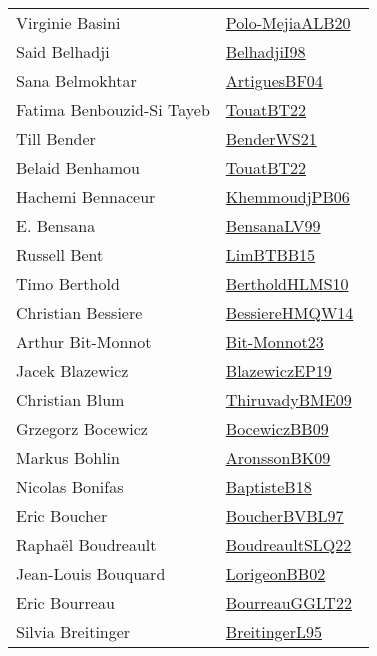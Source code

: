 {\begin{longtable}{p{4cm}p{20cm}}
Virginie Basini & \href{}{Polo-MejiaALB20}~\cite{Polo-MejiaALB20}\\
Said Belhadji & \href{articles/BelhadjiI98.pdf}{BelhadjiI98}~\cite{BelhadjiI98}\\
Sana Belmokhtar & \href{papers/ArtiguesBF04.pdf}{ArtiguesBF04}~\cite{ArtiguesBF04}\\
Fatima Benbouzid{-}Si Tayeb & \href{papers/TouatBT22.pdf}{TouatBT22}~\cite{TouatBT22}\\
Till Bender & \href{papers/BenderWS21.pdf}{BenderWS21}~\cite{BenderWS21}\\
Belaid Benhamou & \href{papers/TouatBT22.pdf}{TouatBT22}~\cite{TouatBT22}\\
Hachemi Bennaceur & \href{papers/KhemmoudjPB06.pdf}{KhemmoudjPB06}~\cite{KhemmoudjPB06}\\
E. Bensana & \href{articles/BensanaLV99.pdf}{BensanaLV99}~\cite{BensanaLV99}\\
Russell Bent & \href{papers/LimBTBB15.pdf}{LimBTBB15}~\cite{LimBTBB15}\\
Timo Berthold & \href{papers/BertholdHLMS10.pdf}{BertholdHLMS10}~\cite{BertholdHLMS10}\\
Christian Bessiere & \href{papers/BessiereHMQW14.pdf}{BessiereHMQW14}~\cite{BessiereHMQW14}\\
Arthur Bit{-}Monnot & \href{papers/Bit-Monnot23.pdf}{Bit-Monnot23}~\cite{Bit-Monnot23}\\
Jacek Blazewicz & \href{}{BlazewiczEP19}~\cite{BlazewiczEP19}\\
Christian Blum & \href{papers/ThiruvadyBME09.pdf}{ThiruvadyBME09}~\cite{ThiruvadyBME09}\\
Grzegorz Bocewicz & \href{}{BocewiczBB09}~\cite{BocewiczBB09}\\
Markus Bohlin & \href{papers/AronssonBK09.pdf}{AronssonBK09}~\cite{AronssonBK09}\\
Nicolas Bonifas & \href{articles/BaptisteB18.pdf}{BaptisteB18}~\cite{BaptisteB18}\\
Eric Boucher & \href{}{BoucherBVBL97}~\cite{BoucherBVBL97}\\
Rapha{\"{e}}l Boudreault & \href{papers/BoudreaultSLQ22.pdf}{BoudreaultSLQ22}~\cite{BoudreaultSLQ22}\\
Jean{-}Louis Bouquard & \href{}{LorigeonBB02}~\cite{LorigeonBB02}\\
Eric Bourreau & \href{articles/BourreauGGLT22.pdf}{BourreauGGLT22}~\cite{BourreauGGLT22}\\
Silvia Breitinger & \href{}{BreitingerL95}~\cite{BreitingerL95}\\

\end{longtable}}
